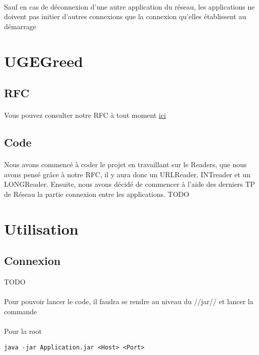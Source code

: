 \documentclass[a4paper,titlepage]{report}
\begin{document}
\paragraph{}
Sauf en cas de déconnexion d'une autre application du réseau, les applications ne doivent pas initier d'autres connexions que la connexion qu'elles établissent au démarrage
\pagebreak
\section{UGEGreed}
\subsection{RFC}
\paragraph{}
Vous pouvez consulter notre RFC à tout moment
\href {https://gitlab.com/Setsulys/ugegreed-debats-ly-ieng/-/blob/main/GreedRfc.md}{ici}
\subsection{Code}
\paragraph{}
Nous avons commencé à coder le projet en travaillant sur le Readers, que nous avons pensé grâce à notre RFC, il y aura donc un URLReader, INTreader et un LONGReader. Ensuite, nous avons décidé de commencer à l'aide des derniers TP de Réseau la partie connexion entre les applications.
TODO
\section{Utilisation}
\subsection{Connexion}
TODO
\paragraph{}
Pour pouvoir lancer le code, il faudra se rendre au niveau du //jar// et lancer la commande 
\paragraph{}
Pour la root
\begin{lstlisting}
java -jar Application.jar <Host> <Port>
\end{lstlisting}
\end{document}
